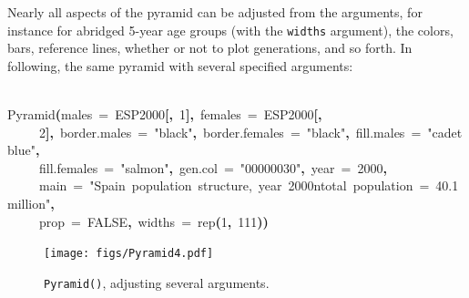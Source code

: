 \documentclass[a4paper]{article}
\newcommand{\hlnumber}[1]{\textcolor[rgb]{0.0823529411764706,0.0784313725490196,0.709803921568627}{#1}}%
\newcommand{\hlfunctioncall}[1]{\textcolor[rgb]{1,0,0}{#1}}%
\newcommand{\hlstring}[1]{\textcolor[rgb]{0.6,0.6,1}{#1}}%
\newcommand{\hlkeyword}[1]{\textcolor[rgb]{0,0,0}{\textbf{#1}}}%
\newcommand{\hlargument}[1]{\textcolor[rgb]{0.694117647058824,0.247058823529412,0.0196078431372549}{#1}}%
\newcommand{\hlsymbol}[1]{\textcolor[rgb]{0,0,0}{#1}}%
\newcommand{\hlprompt}[1]{\textcolor[rgb]{0,0,0}{#1}}%
\newcommand{\hlstd}[1]{\textcolor[rgb]{0,0,0}{#1}}%
\newenvironment{Houtput}{\raggedright}{%
%
}
\begin{document}
Nearly all aspects of the pyramid can be adjusted from the arguments, for instance for abridged 5-year age groups (with the \texttt{widths} argument), the colors, bars, reference lines, whether or not to plot generations, and so forth. In following, the same pyramid with several specified arguments:

\begin{Houtput}
\hspace*{\fill}\\
\hlstd{}\ttfamily\noindent
\hlprompt{\usebox{\hlnormalsizeboxgreaterthan}{\ }}\hlfunctioncall{Pyramid}\hlkeyword{(}\hlargument{males}{\ }\hlargument{=}{\ }\hlsymbol{ESP2000}\hlkeyword{[}\hlkeyword{,}{\ }\hlnumber{1}\hlkeyword{]}\hlkeyword{,}{\ }\hlargument{females}{\ }\hlargument{=}{\ }\hlsymbol{ESP2000}\hlkeyword{[}\hlkeyword{,}\hspace*{\fill}\\
\hlstd{}\hlprompt{{\ }}{\ }{\ }{\ }{\ }\hlnumber{2}\hlkeyword{]}\hlkeyword{,}{\ }\hlargument{border.males}{\ }\hlargument{=}{\ }\hlstring{"black"}\hlkeyword{,}{\ }\hlargument{border.females}{\ }\hlargument{=}{\ }\hlstring{"black"}\hlkeyword{,}{\ }\hlargument{fill.males}{\ }\hlargument{=}{\ }\hlstring{"cadetblue"}\hlkeyword{,}\hspace*{\fill}\\
\hlstd{}\hlprompt{{\ }}{\ }{\ }{\ }{\ }\hlargument{fill.females}{\ }\hlargument{=}{\ }\hlstring{"salmon"}\hlkeyword{,}{\ }\hlargument{gen.col}{\ }\hlargument{=}{\ }\hlstring{"\usebox{\hlnormalsizeboxhash}00000030"}\hlkeyword{,}{\ }\hlargument{year}{\ }\hlargument{=}{\ }\hlnumber{2000}\hlkeyword{,}\hspace*{\fill}\\
\hlstd{}\hlprompt{{\ }}{\ }{\ }{\ }{\ }\hlargument{main}{\ }\hlargument{=}{\ }\hlstring{"Spain{\ }population{\ }structure,{\ }year{\ }2000\usebox{\hlnormalsizeboxbackslash}ntotal{\ }population{\ }={\ }40.1{\ }million"}\hlkeyword{,}\hspace*{\fill}\\
\hlstd{}\hlprompt{{\ }}{\ }{\ }{\ }{\ }\hlargument{prop}{\ }\hlargument{=}{\ }\hlnumber{FALSE}\hlkeyword{,}{\ }\hlargument{widths}{\ }\hlargument{=}{\ }\hlfunctioncall{rep}\hlkeyword{(}\hlnumber{1}\hlkeyword{,}{\ }\hlnumber{111}\hlkeyword{)}\hlkeyword{)}\mbox{}
\normalfont
\hspace*{\fill}\\
\hlstd{}
\end{Houtput}



\begin{figure}[H]
\centering
\texttt{[image: figs/Pyramid4.pdf]}
\caption{\texttt{Pyramid()}, adjusting several arguments.}
\end{figure}
\end{document}

